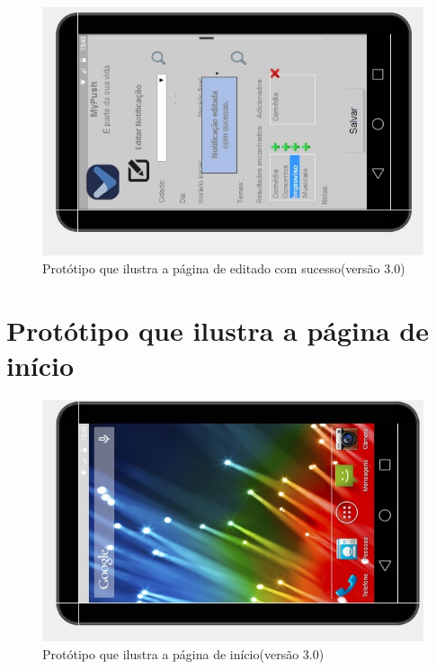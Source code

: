 \begin{apendicesenv}
    \begin{figure}[!htbp]
      \centering
      \includegraphics[scale=0.5, angle=-90]{editaveis/figuras/prototipo_alta_fidelidade_v3/3_15}
      \caption{Protótipo que ilustra a página de editado com sucesso(versão 3.0)}
      \label{v3}
    \end{figure}
    
      \section*{Protótipo que ilustra a página de início}

    \begin{figure}[!htbp]
      \centering
      \includegraphics[scale=0.5, angle=-90]{editaveis/figuras/prototipo_alta_fidelidade_v3/3_16}
      \caption{Protótipo que ilustra a página de início(versão 3.0)}
      \label{v3}
    \end{figure}

\end{apendicesenv}
